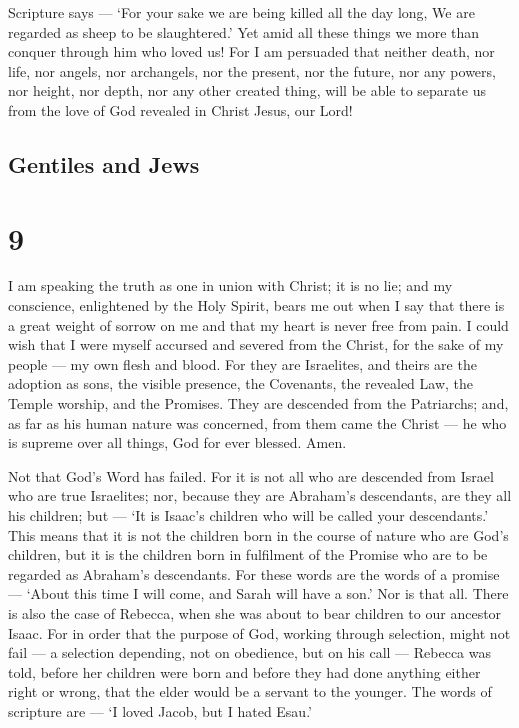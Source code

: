  Scripture says --- `For your sake we are being killed all
the day long, We are regarded as sheep to be slaughtered.' 
Yet amid all these things we more than conquer through him who loved us!
 For I am persuaded that neither death, nor life, nor
angels, nor archangels, nor the present, nor the future, nor any powers,
 nor height, nor depth, nor any other created thing, will
be able to separate us from the love of God revealed in Christ Jesus,
our Lord!

\hypertarget{gentiles-and-jews}{%
\subsection{Gentiles and Jews}\label{gentiles-and-jews}}

\hypertarget{section-8}{%
\section{9}\label{section-8}}

 I am speaking the truth as one in union with Christ; it is
no lie; and my conscience, enlightened by the Holy Spirit, 
bears me out when I say that there is a great weight of sorrow on me and
that my heart is never free from pain.  I could wish that I
were myself accursed and severed from the Christ, for the sake of my
people --- my own flesh and blood.  For they are Israelites,
and theirs are the adoption as sons, the visible presence, the
Covenants, the revealed Law, the Temple worship, and the Promises.
 They are descended from the Patriarchs; and, as far as his
human nature was concerned, from them came the Christ --- he who is
supreme over all things, God for ever blessed. Amen.

 Not that God's Word has failed. For it is not all who are
descended from Israel who are true Israelites;  nor, because
they are Abraham's descendants, are they all his children; but --- `It
is Isaac's children who will be called your descendants.' 
This means that it is not the children born in the course of nature who
are God's children, but it is the children born in fulfilment of the
Promise who are to be regarded as Abraham's descendants. 
For these words are the words of a promise --- `About this time I will
come, and Sarah will have a son.'  Nor is that all. There
is also the case of Rebecca, when she was about to bear children to our
ancestor Isaac.  For in order that the purpose of God,
working through selection, might not fail --- a selection depending, not
on obedience, but on his call --- Rebecca was told, before her children
were born and before they had done anything either right or wrong,
 that the elder would be a servant to the younger.
 The words of scripture are --- `I loved Jacob, but I hated
Esau.'

